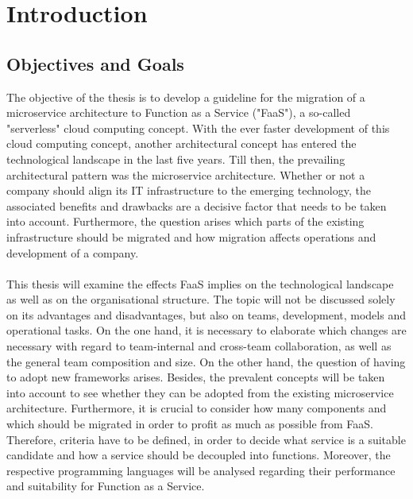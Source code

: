 \documentclass[a4paper,11pt, pagesize]{scrartcl}
\begin{document}
\begin{spacing}{1.2}
\begin{spacing}{1.07}
\begin{tabular}{ p{2cm} p{10cm}}
\end{tabular}
\end{spacing}
\newpage
\begin{spacing}{1.2}
\tableofcontents
\end{spacing}
\newpage
\afterpage{\blankpage}
\section{Introduction}
\label{Introduction}

\subsection{Objectives and Goals}
\label{Objectives and Goals}
The objective of the thesis is to develop a guideline for the migration of a microservice architecture to Function as a Service ("FaaS"), a so-called "serverless" cloud computing concept. With the ever faster development of this cloud computing concept, another architectural concept has entered the technological landscape in the last five years. Till then, the prevailing architectural pattern was the microservice architecture. Whether or not a company should align its IT infrastructure to the emerging technology, the associated benefits and drawbacks are a decisive factor that needs to be taken into account. Furthermore, the question arises which parts of the existing infrastructure should be migrated and how migration affects operations and development of a company.\\\\
This thesis will examine the effects FaaS implies on the technological landscape as well as on the organisational structure. The topic will not be discussed solely on its advantages and disadvantages, but also on teams, development, models and operational tasks. On the one hand, it is necessary to elaborate which changes are necessary with regard to team-internal and cross-team collaboration, as well as the general team composition and size. On the other hand, the question of having to adopt new frameworks arises. Besides, the prevalent concepts will be taken into account to see whether they can be adopted from the existing microservice architecture. Furthermore, it is crucial to consider how many components and which should be migrated in order to profit as much as possible from FaaS. Therefore, criteria have to be defined, in order to decide what service is a suitable candidate and how a service should be decoupled into functions. Moreover, the respective programming languages will be analysed regarding their performance and suitability for Function as a Service. \\\\

\end{spacing}
\end{document}
